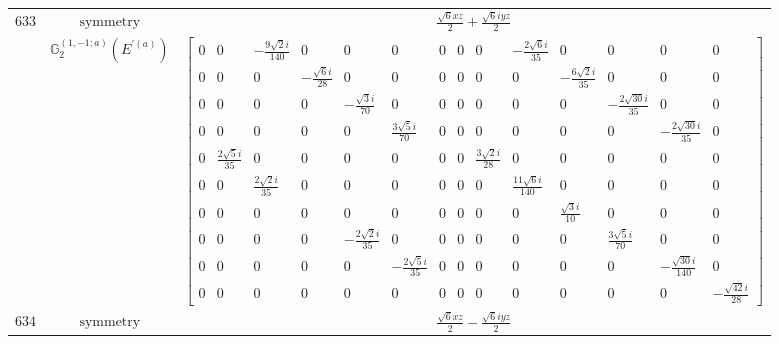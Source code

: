 \documentclass[fleqn,8pt,landscape]{jsarticle}
\begin{document}
\begin{longtable}{ccc}
$ 633 $ & $ \text{symmetry} $ & $ \frac{\sqrt{6} x z}{2} + \frac{\sqrt{6} i y z}{2} $ \\
$  $ & $ \mathbb{G}_{2}^{(1,-1;a)}(E^{\prime(a)}) $ & $ \begin{bmatrix} 0 & 0 & - \frac{9 \sqrt{2} i}{140} & 0 & 0 & 0 & 0 & 0 & 0 & - \frac{2 \sqrt{6} i}{35} & 0 & 0 & 0 & 0 \\ 0 & 0 & 0 & - \frac{\sqrt{6} i}{28} & 0 & 0 & 0 & 0 & 0 & 0 & - \frac{6 \sqrt{2} i}{35} & 0 & 0 & 0 \\ 0 & 0 & 0 & 0 & - \frac{\sqrt{3} i}{70} & 0 & 0 & 0 & 0 & 0 & 0 & - \frac{2 \sqrt{30} i}{35} & 0 & 0 \\ 0 & 0 & 0 & 0 & 0 & \frac{3 \sqrt{5} i}{70} & 0 & 0 & 0 & 0 & 0 & 0 & - \frac{2 \sqrt{30} i}{35} & 0 \\ 0 & \frac{2 \sqrt{5} i}{35} & 0 & 0 & 0 & 0 & 0 & 0 & \frac{3 \sqrt{2} i}{28} & 0 & 0 & 0 & 0 & 0 \\ 0 & 0 & \frac{2 \sqrt{2} i}{35} & 0 & 0 & 0 & 0 & 0 & 0 & \frac{11 \sqrt{6} i}{140} & 0 & 0 & 0 & 0 \\ 0 & 0 & 0 & 0 & 0 & 0 & 0 & 0 & 0 & 0 & \frac{\sqrt{3} i}{10} & 0 & 0 & 0 \\ 0 & 0 & 0 & 0 & - \frac{2 \sqrt{2} i}{35} & 0 & 0 & 0 & 0 & 0 & 0 & \frac{3 \sqrt{5} i}{70} & 0 & 0 \\ 0 & 0 & 0 & 0 & 0 & - \frac{2 \sqrt{5} i}{35} & 0 & 0 & 0 & 0 & 0 & 0 & - \frac{\sqrt{30} i}{140} & 0 \\ 0 & 0 & 0 & 0 & 0 & 0 & 0 & 0 & 0 & 0 & 0 & 0 & 0 & - \frac{\sqrt{42} i}{28} \end{bmatrix} $ \\ \hline
$ 634 $ & $ \text{symmetry} $ & $ \frac{\sqrt{6} x z}{2} - \frac{\sqrt{6} i y z}{2} $ \\

\end{longtable}
\end{document}
